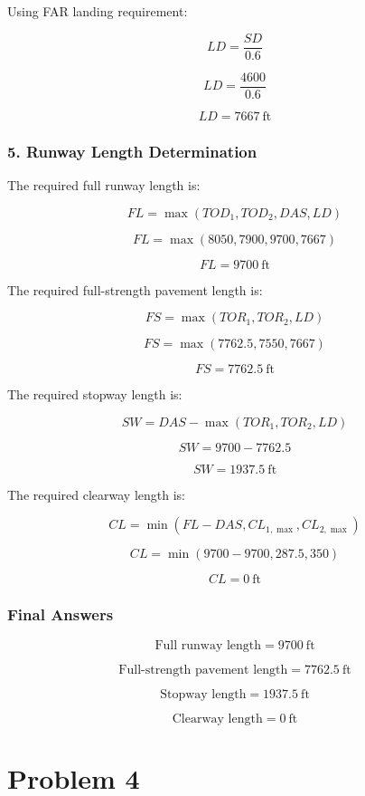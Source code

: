 \documentclass{KPS_assignment}
\begin{document}
Using FAR landing requirement:

\[
LD = \frac{SD}{0.6}
\]

\[
LD = \frac{4600}{0.6}
\]

\[
LD = 7667 \ \text{ft}
\]

\subsubsection*{5. Runway Length Determination}

The required full runway length is:

\[
FL = \max(TOD_1, TOD_2, DAS, LD)
\]

\[
FL = \max(8050, 7900, 9700, 7667)
\]

\[
FL = 9700 \ \text{ft}
\]

The required full-strength pavement length is:

\[
FS = \max(TOR_1, TOR_2, LD)
\]

\[
FS = \max(7762.5, 7550, 7667)
\]

\[
FS = 7762.5 \ \text{ft}
\]

The required stopway length is:

\[
SW = DAS - \max(TOR_1, TOR_2, LD)
\]

\[
SW = 9700 - 7762.5
\]

\[
SW = 1937.5 \ \text{ft}
\]

The required clearway length is:

\[
CL = \min(FL - DAS, CL_{1,\max}, CL_{2,\max})
\]

\[
CL = \min(9700 - 9700, 287.5, 350)
\]

\[
CL = 0 \ \text{ft}
\]

\subsubsection*{Final Answers}

\[
\boxed{
\text{Full runway length} = 9700 \ \text{ft}
}
\]

\[
\boxed{
\text{Full-strength pavement length} = 7762.5 \ \text{ft}
}
\]

\[
\boxed{
\text{Stopway length} = 1937.5 \ \text{ft}
}
\]

\[
\boxed{
\text{Clearway length} = 0 \ \text{ft}
}
\]


\section*{Problem 4}
\end{document}
